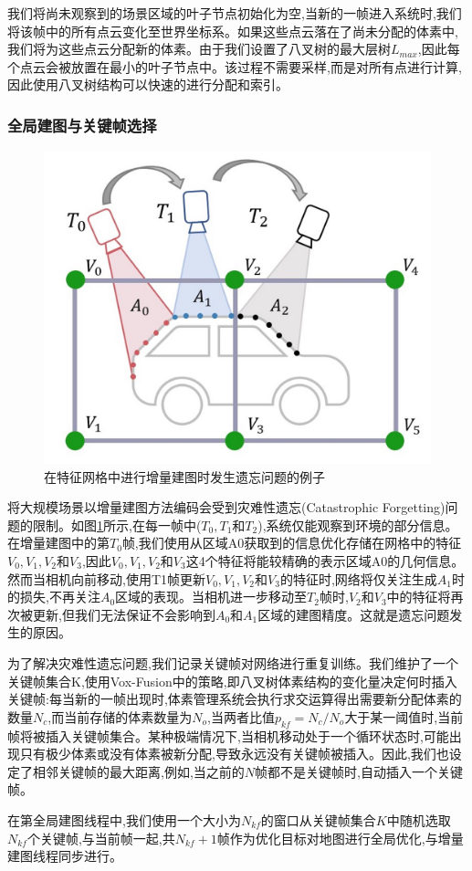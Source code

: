 我们将尚未观察到的场景区域的叶子节点初始化为空,当新的一帧进入系统时,我们将该帧中的所有点云变化至世界坐标系。如果这些点云落在了尚未分配的体素中,我们将为这些点云分配新的体素。由于我们设置了八叉树的最大层树$L_{max}$,因此每个点云会被放置在最小的叶子节点中。该过程不需要采样,而是对所有点进行计算,因此使用八叉树结构可以快速的进行分配和索引。
\subsubsection{全局建图与关键帧选择}
\begin{figure}[htbp]
    \includegraphics[scale = 0.2]{figures/forgetting.jpg}
    \centering
    \caption{在特征网格中进行增量建图时发生遗忘问题的例子} \label{forgetting}
\end{figure}
将大规模场景以增量建图方法编码会受到灾难性遗忘(Catastrophic Forgetting)问题的限制。如图\ref{forgetting}所示,在每一帧中($T_0, T_1$和$T_2$),系统仅能观察到环境的部分信息。在增量建图中的第$T_0$帧,我们使用从区域A0获取到的信息优化存储在网格中的特征$V_0, V_1, V_2$和$V_3$,因此$V_0, V_1, V_2$和$V_3$这4个特征将能较精确的表示区域A0的几何信息。然而当相机向前移动,使用T1帧更新$V_0, V_1, V_2$和$V_3$的特征时,网络将仅关注生成$A_1$时的损失,不再关注$A_0$区域的表现。当相机进一步移动至$T_2$帧时,$V_2$和$V_3$中的特征将再次被更新,但我们无法保证不会影响到$A_0$和$A_1$区域的建图精度。这就是遗忘问题发生的原因。

为了解决灾难性遗忘问题,我们记录关键帧对网络进行重复训练。我们维护了一个关键帧集合K,使用Vox-Fusion中的策略,即八叉树体素结构的变化量决定何时插入关键帧:每当新的一帧出现时,体素管理系统会执行求交运算得出需要新分配体素的数量$N_c$,而当前存储的体素数量为$N_o$,当两者比值$p_{kf}=N_c/N_o$大于某一阈值时,当前帧将被插入关键帧集合。某种极端情况下,当相机移动处于一个循环状态时,可能出现只有极少体素或没有体素被新分配,导致永远没有关键帧被插入。因此,我们也设定了相邻关键帧的最大距离,例如,当之前的$N$帧都不是关键帧时,自动插入一个关键帧。

在第全局建图线程中,我们使用一个大小为$N_{kf}$的窗口从关键帧集合$K$中随机选取$N_{kf}$个关键帧,与当前帧一起,共$N_{kf}+1$帧作为优化目标对地图进行全局优化,与增量建图线程同步进行。
